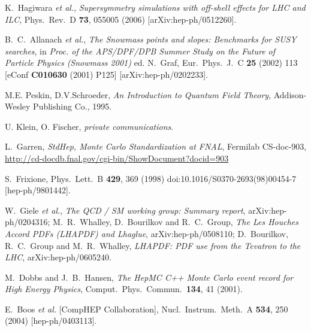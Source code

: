 \documentclass[12pt]{book}
\begin{document}
\begin{thebibliography}{19}
  K.~Hagiwara {\it et al.},
  {\em Supersymmetry simulations with off-shell effects for LHC and
    ILC},
  Phys.\ Rev.\  D {\bf 73}, 055005 (2006)
  [arXiv:hep-ph/0512260].

  B.~C.~Allanach {\it et al.},
  {\em The Snowmass points and slopes: Benchmarks for SUSY searches},
  in {\it Proc. of the APS/DPF/DPB Summer Study on the Future of Particle Physics (Snowmass 2001) } ed. N.~Graf,
  Eur.\ Phys.\ J.\ C {\bf 25} (2002) 113
  [eConf {\bf C010630} (2001) P125]
  [arXiv:hep-ph/0202233].

  M.E. Peskin, D.V.Schroeder, {\em An Introduction to Quantum Field
    Theory}, Addison-Wesley Publishing Co., 1995.

  U. Klein, O. Fischer, {\em private communications}.

  L.~Garren, {\em StdHep, Monte Carlo Standardization at FNAL},
  Fermilab CS-doc-903,
  \url{http://cd-docdb.fnal.gov/cgi-bin/ShowDocument?docid=903}

  S.~Frixione,
  Phys.\ Lett.\ B {\bf 429}, 369 (1998)
  doi:10.1016/S0370-2693(98)00454-7
  [hep-ph/9801442].

  W.~Giele {\it et al.},
  {\em The QCD / SM working group: Summary report},
  arXiv:hep-ph/0204316;
  M.~R.~Whalley, D.~Bourilkov and R.~C.~Group,
  {\em The Les Houches Accord PDFs (LHAPDF) and Lhaglue},
  arXiv:hep-ph/0508110;
  D.~Bourilkov, R.~C.~Group and M.~R.~Whalley,
  {\em LHAPDF: PDF use from the Tevatron to the LHC},
  arXiv:hep-ph/0605240.

  M.~Dobbs and J.~B.~Hansen,
  {\em The HepMC C++ Monte Carlo event record for High Energy
    Physics},
  Comput.\ Phys.\ Commun.\  {\bf 134}, 41 (2001).

  E.~Boos {\it et al.}  [CompHEP Collaboration],
  Nucl.\ Instrum.\ Meth.\ A {\bf 534}, 250 (2004)
  [hep-ph/0403113].


\end{thebibliography}
\end{document}
